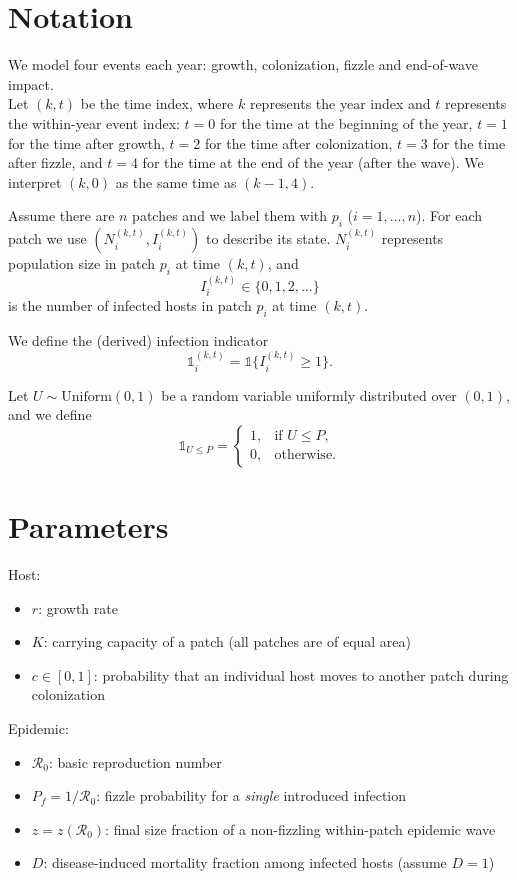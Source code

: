 \documentclass[12pt]{article}
\begin{document}
\section{Notation}
We model four events each year: growth, colonization, fizzle and end-of-wave impact. \\

Let $(k,t)$ be the time index, where $k$ represents the year index and $t$ represents the within-year event index:
$t=0$ for the time at the beginning of the year,
$t=1$ for the time after growth,
$t=2$ for the time after colonization,
$t=3$ for the time after fizzle,
and $t=4$ for the time at the end of the year (after the wave).
We interpret $(k,0)$ as the same time as $(k-1,4)$.

Assume there are $n$ patches and we label them with $p_i$ ($i=1,\dots,n$).
For each patch we use $(N_i^{(k,t)}, I_i^{(k,t)})$ to describe its state.
$N_i^{(k,t)}$ represents population size in patch $p_i$ at time $(k,t)$, and
\[
I_i^{(k,t)}\in\{0,1,2,\dots\}
\]
is the number of infected hosts in patch $p_i$ at time $(k,t)$.

We define the (derived) infection indicator
\[
\mathds{1}_i^{(k,t)}=\mathds{1}\{I_i^{(k,t)}\ge 1\}.
\]

Let $U \sim \text{Uniform}(0, 1)$ be a random variable uniformly distributed over $(0,1)$, and we define
\[
\mathds{1}_{U \leq P} =
\begin{cases}
1, & \text{if } U \leq P, \\
0, & \text{otherwise.}
\end{cases}
\]

\section{Parameters}
Host:
\begin{itemize}
\item $r$: growth rate
\item $K$: carrying capacity of a patch (all patches are of equal area)
\item $c\in[0,1]$: probability that an individual host moves to another patch during colonization
\end{itemize}

Epidemic:
\begin{itemize}
\item $\mathcal{R}_0$: basic reproduction number
\item $P_f = 1/\mathcal{R}_0$: fizzle probability for a \emph{single} introduced infection
\item $z=z(\mathcal{R}_0)$: final size fraction of a non-fizzling within-patch epidemic wave
\item $D$: disease-induced mortality fraction among infected hosts (assume $D=1$)
\end{itemize}
\end{document}
